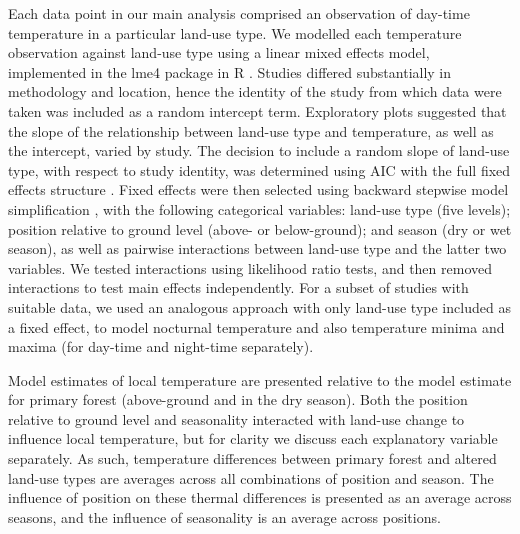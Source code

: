\documentclass[12pt,a4paper,]{report}
\theoremstyle{definition}
\theoremstyle{definition}
\theoremstyle{definition}
\theoremstyle{remark}
\begin{document}
Each data point in our main analysis comprised an observation of
day-time temperature in a particular land-use type. We modelled each
temperature observation against land-use type using a linear mixed
effects model, implemented in the lme4 package
\citep{bates_fitting_2015} in R \citep{r_core_team_2017}. Studies
differed substantially in methodology and location, hence the identity
of the study from which data were taken was included as a random
intercept term. Exploratory plots suggested that the slope of the
relationship between land-use type and temperature, as well as the
intercept, varied by study. The decision to include a random slope of
land-use type, with respect to study identity, was determined using AIC
with the full fixed effects structure \citep{zuur_mixed_2009}. Fixed
effects were then selected using backward stepwise model simplification
\citep{zuur_mixed_2009}, with the following categorical variables:
land-use type (five levels); position relative to ground level (above-
or below-ground); and season (dry or wet season), as well as pairwise
interactions between land-use type and the latter two variables. We
tested interactions using likelihood ratio tests, and then removed
interactions to test main effects independently. For a subset of studies
with suitable data, we used an analogous approach with only land-use
type included as a fixed effect, to model nocturnal temperature and also
temperature minima and maxima (for day-time and night-time separately).

Model estimates of local temperature are presented relative to the model
estimate for primary forest (above-ground and in the dry season). Both
the position relative to ground level and seasonality interacted with
land-use change to influence local temperature, but for clarity we
discuss each explanatory variable separately. As such, temperature
differences between primary forest and altered land-use types are
averages across all combinations of position and season. The influence
of position on these thermal differences is presented as an average
across seasons, and the influence of seasonality is an average across
positions.
\end{document}
